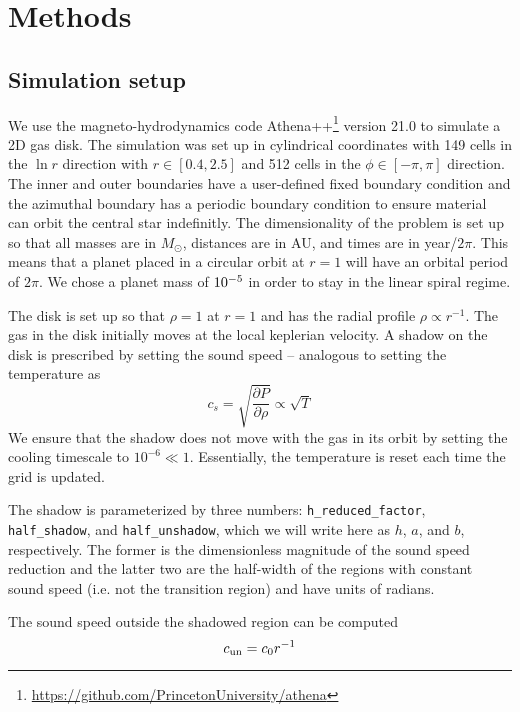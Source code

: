 \documentclass[twocolumn]{aastex631}
\begin{document}
\section{Methods}
\label{sec:methods}
\subsection{Simulation setup}
\label{subsec:setup}
We use the magneto-hydrodynamics code Athena++\footnote{\url{https://github.com/PrincetonUniversity/athena}} 
\citep{stone2020} version 21.0 \citep{athena++developmentteam2021} to simulate a 2D gas disk. The simulation was set up in cylindrical coordinates with 149
cells in the $\ln{r}$ direction with $r \in [0.4, 2.5]$ and 512 cells in the $\phi \in [-\pi, \pi]$ direction. The inner and outer boundaries have a user-defined fixed boundary
condition and the azimuthal boundary has a periodic boundary condition to ensure material can orbit the central star indefinitly. The dimensionality of the problem
is set up so that all masses are in $M_\odot$, distances are in AU, and times are in year/$2\pi$. This means that a planet placed in a circular orbit at $r=1$
will have an orbital period of $2\pi$. We chose a planet mass of $10^{-5}$ in order to stay in the linear spiral regime.

The disk is set up so that $\rho = 1$ at $r=1$ and has the radial profile $\rho \propto r^{-1}$. The gas in the disk initially moves at the local keplerian velocity.
A shadow on the disk is prescribed by setting the sound speed -- analogous to setting the temperature as 
\begin{equation}
    c_s = \sqrt{\frac{\partial P}{\partial \rho}} \propto \sqrt{T}
\end{equation}
We ensure that the shadow does not move with the gas in its orbit by setting the cooling timescale to $10^{-6} \ll 1$. Essentially, the temperature is reset each time
the grid is updated.

The shadow is parameterized by three numbers: \texttt{h\_reduced\_factor}, \texttt{half\_shadow}, and \texttt{half\_unshadow},
which we will write here as $h$, $a$, and $b$, respectively. The former is the dimensionless magnitude of the sound speed reduction
and the latter two are the half-width of the regions with constant sound speed (i.e. not the transition region) and have
units of radians.

The sound speed outside the shadowed region can be computed
\begin{equation}
    c_{\rm un} = c_0 r^{-1}
\end{equation}
\end{document}
